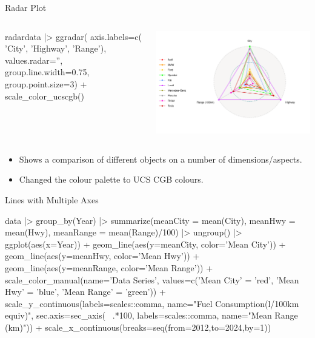\documentclass[ignorenonframetext,xcolor=x11names]{beamer}
\begin{document}
\begin{frame}[fragile]{Radar Plot}
\begin{columns}
\begin{column}{.45\textwidth}
\begin{Rcode}
radardata |>  
  ggradar(
    axis.labels=c(
       'City', 
       'Highway', 
       'Range'), 
    values.radar='', 
    group.line.width=0.75, 
    group.point.size=3) +
  scale_color_ucscgb()
\end{Rcode}
\end{column}
\begin{column}{.65\textwidth}
  \includegraphics[width=.9\textwidth]{fuel.radar.pdf}
\end{column}
\end{columns}
\footnotesize
\begin{itemize}
   \item Shows a comparison of different objects on a number of dimensions/aspects. 
   \item Changed the colour palette to UCS CGB colours. 
\end{itemize}
\end{frame}



\begin{frame}[fragile]{Lines with Multiple Axes}
\footnotesize
\begin{Rcode}
data |>
   group_by(Year) |>
   summarize(meanCity = mean(City), 
             meanHwy = mean(Hwy), 
             meanRange = mean(Range)/100) |>
   ungroup() |>
ggplot(aes(x=Year)) +
  geom_line(aes(y=meanCity, color='Mean City')) + 
  geom_line(aes(y=meanHwy, color='Mean Hwy')) +
  geom_line(aes(y=meanRange, color='Mean Range')) +
  scale_color_manual(name='Data Series', 
     values=c('Mean City' = 'red', 
              'Mean Hwy' = 'blue', 
              'Mean Range' = 'green')) +
  scale_y_continuous(labels=scales::comma, 
      name="Fuel Consumption\n(l/100km equiv)", 
      sec.axis=sec_axis(~ .*100, 
                        labels=scales::comma, 
                        name="Mean Range (km)")) + 
  scale_x_continuous(breaks=seq(from=2012,to=2024,by=1))
\end{Rcode}
\end{frame}
\end{document}
